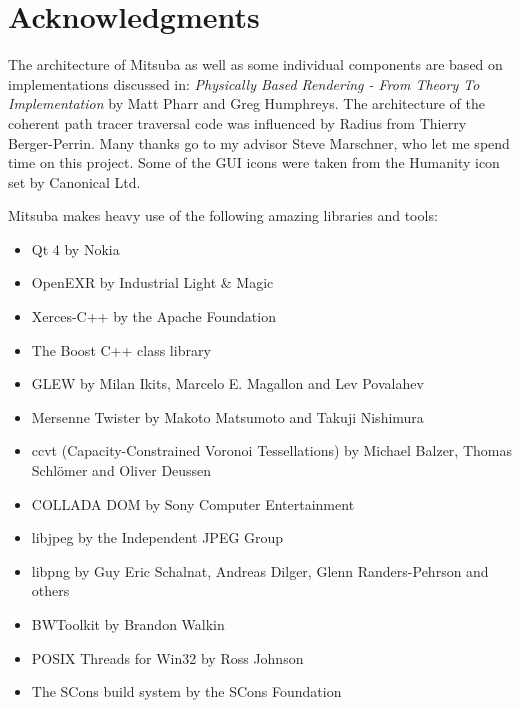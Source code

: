 \section{Acknowledgments}
The architecture of Mitsuba as well as some individual components are based on implementations discussed in: \emph{Physically Based Rendering - From Theory To Implementation} by Matt Pharr and Greg Humphreys.
The architecture of the coherent path tracer traversal code was influenced by Radius from Thierry Berger-Perrin.
Many thanks go to my advisor Steve Marschner, who let me spend time on this project.
Some of the GUI icons were taken from the Humanity icon set by Canonical Ltd.

Mitsuba makes heavy use of the following amazing libraries and tools: 
\begin{itemize}
\item Qt 4 by Nokia
\item OpenEXR by Industrial Light \& Magic
\item Xerces-C+\!+ by the Apache Foundation
\item The Boost C+\!+ class library
\item GLEW by Milan Ikits, Marcelo E. Magallon and Lev Povalahev
\item Mersenne Twister by Makoto Matsumoto and Takuji Nishimura
\item ccvt (Capacity-Constrained Voronoi Tessellations) by Michael Balzer, Thomas Schlömer and Oliver Deussen
\item COLLADA DOM by Sony Computer Entertainment
\item libjpeg by the Independent JPEG Group
\item libpng by Guy Eric Schalnat, Andreas Dilger, Glenn Randers-Pehrson and \mbox{others}
\item BWToolkit by Brandon Walkin
\item POSIX Threads for Win32 by Ross Johnson
\item The SCons build system by the SCons Foundation
\end{itemize}

